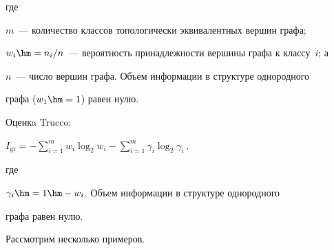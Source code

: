    где 


   $m$~--- количество классов топологически эквивалентных вершин графа; 


$w_i\hm=n_i/n$~--- вероятность принадлежности вершины графа к классу~$i$; а 


$n$~--- число вершин графа. Объем информации в структуре однородного 


графа ($w_1\hm=1$) равен нулю.





Оценкa Trucco: 


$


I_{\mathrm{gr}}=-\sum\limits_{i=1}^m w_i 


\log_2 w_i- \sum\limits_{i=1}^m \gamma_i\log_2\gamma_i\,,


$


где 


$\gamma_i\hm=  1 \hm-w_i$. Объем информации в структуре однородного 


графа равен нулю.


   


   Рассмотрим несколько примеров.


